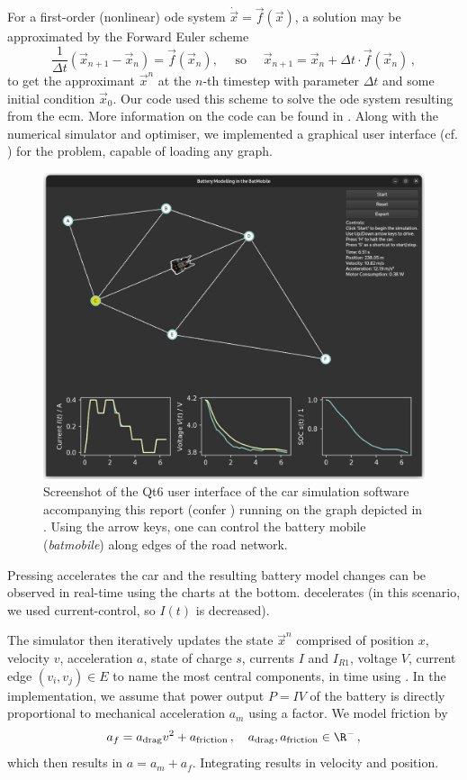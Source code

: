 \documentclass{prettytex/ox/mmsc-special-topic}
\begin{document}
  For a first-order (nonlinear) \gls{ode} system $\dot{\vec{x}} = \vec{f}(\vec{x})$, a solution may be approximated by the Forward Euler scheme
  \begin{equation}
    \frac{1}{\Delta t} \left(\vec{x}_{n+1} - \vec{x}_{n}\right) = \vec{f}(\vec{x}_n), \quad \text{ so } \quad \vec{x}_{n+1} = \vec{x}_{n} + \Delta t \cdot \vec{f}(\vec{x}_n)\,,
    \label{eq:forward-euler}
  \end{equation}
  to get the approximant $\vec{x}^n$ at the $n$-th timestep with parameter $\Delta t$ and some initial condition $\vec{x}_{0}$.
  Our code used this scheme to solve the \gls{ode} system resulting from the \gls{ecm}. More information on the code can be found in .
  Along with the numerical simulator and optimiser, we implemented a graphical user interface (cf. ) for the problem, capable of loading any graph.

  \begin{figure}[H]
    \centering
    \includegraphics[width=0.65\linewidth]{figures/screenshot.png}
    \caption{Screenshot of the Qt6 user interface of the car simulation software accompanying this report (confer ) running on the graph depicted in . Using the arrow keys, one can control the battery mobile (\textit{batmobile}) along edges of the road network.}
    \label{fig:user-interface}
  \end{figure}

  Pressing \keys{$\uparrow$} accelerates the car and the resulting battery model changes can be observed in real-time using the charts at the bottom. \keys{$\downarrow$} decelerates (in this scenario, we used current-control, so $I(t)$ is decreased).

  The simulator then iteratively updates the state $\vec{x}^n$ comprised of position $x$, velocity $v$, acceleration $a$, state of charge $s$, currents $I$ and $I_{R1}$, voltage $V$, current edge $(v_i, v_j) \in E$ to name the most central components, in time using .
  In the implementation, we assume that power output $P = IV$ of the battery is directly proportional to mechanical acceleration $a_m$ using a factor.
  We model friction by
  $$a_f = a_{\rm drag} v^2 + a_{\rm friction}\,,\quad a_{\rm drag}, a_{\rm friction} \in \R^-\,,$$
  which then results in $a = a_m + a_f$.
  Integrating results in velocity and position.
\end{document}
